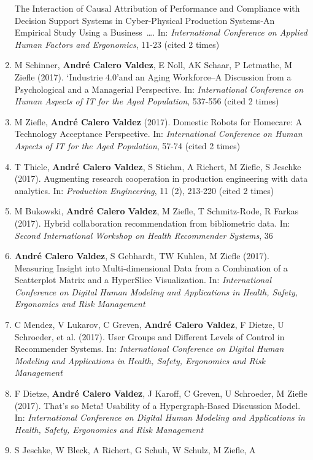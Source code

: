 \documentclass[11pt,a4paper,sans]{moderncv}
\begin{document}
\begin{enumerate}
  The Interaction of Causal Attribution of Performance and Compliance
  with Decision Support Systems in Cyber-Physical Production Systems-An
  Empirical Study Using a Business~\ldots{}. In: \emph{International
  Conference on Applied Human Factors and Ergonomics}, 11-23 (cited 2
  times)
\item
  M Schinner, \textbf{André Calero Valdez}, E Noll, AK Schaar, P
  Letmathe, M Ziefle (2017). `Industrie 4.0'and an Aging Workforce--A
  Discussion from a Psychological and a Managerial Perspective. In:
  \emph{International Conference on Human Aspects of IT for the Aged
  Population}, 537-556 (cited 2 times)
\item
  M Ziefle, \textbf{André Calero Valdez} (2017). Domestic Robots for
  Homecare: A Technology Acceptance Perspective. In: \emph{International
  Conference on Human Aspects of IT for the Aged Population}, 57-74
  (cited 2 times)
\item
  T Thiele, \textbf{André Calero Valdez}, S Stiehm, A Richert, M Ziefle,
  S Jeschke (2017). Augmenting research cooperation in production
  engineering with data analytics. In: \emph{Production Engineering}, 11
  (2), 213-220 (cited 2 times)
\item
  M Bukowski, \textbf{André Calero Valdez}, M Ziefle, T Schmitz-Rode, R
  Farkas (2017). Hybrid collaboration recommendation from bibliometric
  data. In: \emph{Second International Workshop on Health Recommender
  Systems}, 36
\item
  \textbf{André Calero Valdez}, S Gebhardt, TW Kuhlen, M Ziefle (2017).
  Measuring Insight into Multi-dimensional Data from a Combination of a
  Scatterplot Matrix and a HyperSlice Visualization. In:
  \emph{International Conference on Digital Human Modeling and
  Applications in Health, Safety, Ergonomics and Risk Management}
\item
  C Mendez, V Lukarov, C Greven, \textbf{André Calero Valdez}, F Dietze,
  U Schroeder, et al. (2017). User Groups and Different Levels of
  Control in Recommender Systems. In: \emph{International Conference on
  Digital Human Modeling and Applications in Health, Safety, Ergonomics
  and Risk Management}
\item
  F Dietze, \textbf{André Calero Valdez}, J Karoff, C Greven, U
  Schroeder, M Ziefle (2017). That's so Meta! Usability of a
  Hypergraph-Based Discussion Model. In: \emph{International Conference
  on Digital Human Modeling and Applications in Health, Safety,
  Ergonomics and Risk Management}
\item
  S Jeschke, W Bleck, A Richert, G Schuh, W Schulz, M Ziefle, A

\end{enumerate}
\end{document}
